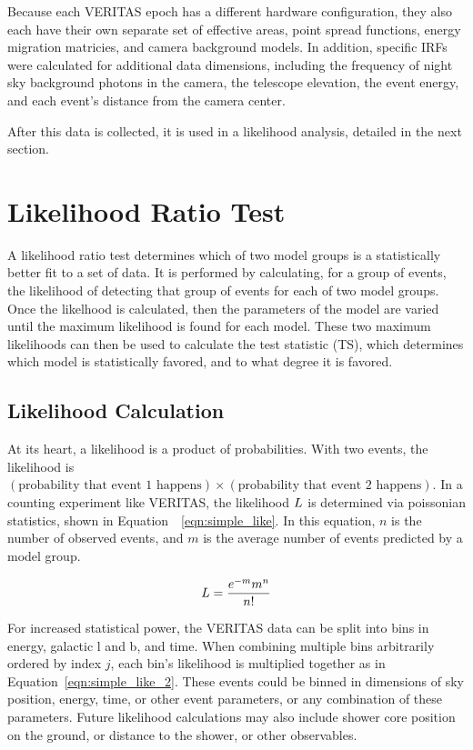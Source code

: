   Because each VERITAS epoch has a different hardware configuration, they also each have their own separate set of effective areas, point spread functions, energy migration matricies, and camera background models.
  In addition, specific IRFs were calculated for additional data dimensions, including the frequency of night sky background photons in the camera, the telescope elevation, the event energy, and each event's distance from the camera center.
  
  After this data is collected, it is used in a likelihood analysis, detailed in the next section.

\section{Likelihood Ratio Test}\label{sec:likeratio}
  A likelihood ratio test determines which of two model groups is a statistically better fit to a set of data.
  It is performed by calculating, for a group of events, the likelihood of detecting that group of events for each of two model groups.
  Once the likelhood is calculated, then the parameters of the model are varied until the maximum likelihood is found for each model.
  These two maximum likelihoods can then be used to calculate the test statistic (TS), which determines which model is statistically favored, and to what degree it is favored.
  
  \subsection{Likelihood Calculation}
  At its heart, a likelihood is a product of probabilities.
  With two events, the likelihood is $(\textrm{probability that event 1 happens})\times(\textrm{probability that event 2 happens})$.
  In a counting experiment like VERITAS, the likelihood $L$ is determined via poissonian statistics, shown in Equation~~\ref{eqn:simple_like}.
  In this equation, $n$ is the number of observed events, and $m$ is the average number of events predicted by a model group.
  
  \begin{equation}\label{eqn:simple_like}
    L = \frac{e^{-m} m^n}{n!}
  \end{equation}
  
  For increased statistical power, the VERITAS data can be split into bins in energy, galactic l and b, and time.
  When combining multiple bins arbitrarily ordered by index $j$, each bin's likelihood is multiplied together as in Equation~\ref{eqn:simple_like_2}.
  These events could be binned in dimensions of sky position, energy, time, or other event parameters, or any combination of these parameters.
  Future likelihood calculations may also include shower core position on the ground, or distance to the shower, or other observables.
  
